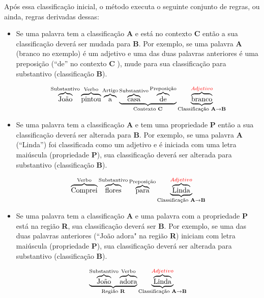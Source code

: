 Após essa classificação inicial, o método executa o seguinte conjunto de
regras, ou ainda, regras derivadas dessas:

\begin{itemize}
  \item Se uma palavra tem a classificação \textbf{A} e está no contexto
  \textbf{C} então a sua classificação deverá ser mudada para \textbf{B}. Por
  exemplo, se uma palavra \textbf{A} (branco no exemplo) é um adjetivo e uma das
  duas palavras anteriores é uma preposição (``de'' no contexto \textbf{C}
  ), mude para sua classificação para substantivo (classificação \textbf{B}).
  
  \[\overbrace{\text{João}}^\text{Substantivo}
  \overbrace{\text{pintou}}^\text{Verbo}
  \overbrace{\text{a}}^\text{Artigo}
  \underbrace{
  \overbrace{\text{casa}}^\text{Substantivo}
  \overbrace{\text{de}}^\text{Preposição}}_\text{Contexto \textbf{C}}
  \underbrace{\overbrace{\text{branco}}^{\textcolor{red}{Adjetivo}}}_\text{Classificação
  \textbf{A}\textrightarrow\textbf{B}}
  \]
  
  \item Se uma palavra tem a classificação \textbf{A} e tem uma propriedade
  \textbf{P} então a sua classificação deverá ser alterada para \textbf{B}. Por
  exemplo, se uma palavra \textbf{A} (``Linda'') foi classificada como um
  adjetivo e é iniciada com uma letra maiúscula (propriedade \textbf{P}), sua
  classificação deverá ser alterada para substantivo (classificação \textbf{B}).
  
  \[\overbrace{\text{Comprei}}^\text{Verbo}
  \overbrace{\text{flores}}^\text{Substantivo}
  \overbrace{\text{para}}^\text{Preposição}
  \underbrace{\overbrace{\text{L}\text{inda}}^{\textcolor{red}{Adjetivo}}}_\text{Classificação
  \textbf{A}\textrightarrow\textbf{B}}
  \]
  
  \item Se uma palavra tem a classificação \textbf{A} e uma palavra com a
  propriedade \textbf{P} está na região \textbf{R}, sua classificação deverá
  ser \textbf{B}. Por exemplo, se uma das duas palavras anteriores (``João
  adora" na região \textbf{R}) iniciam com letra maiúscula (propriedade
  \textbf{P}), sua classificação deverá ser alterada para substantivo (classificação \textbf{B}).
  
  \[\underbrace{\overbrace{\text{João}}^\text{Substantivo}
  \overbrace{\text{adora}}^\text{Verbo}}_\text{Região \textbf{R}}
  \underbrace{\overbrace{\text{L}\text{inda}}^{\textcolor{red}{Adjetivo}}}_\text{Classificação
  \textbf{A}\textrightarrow\textbf{B}}
  \]
  
  
\end{itemize}


